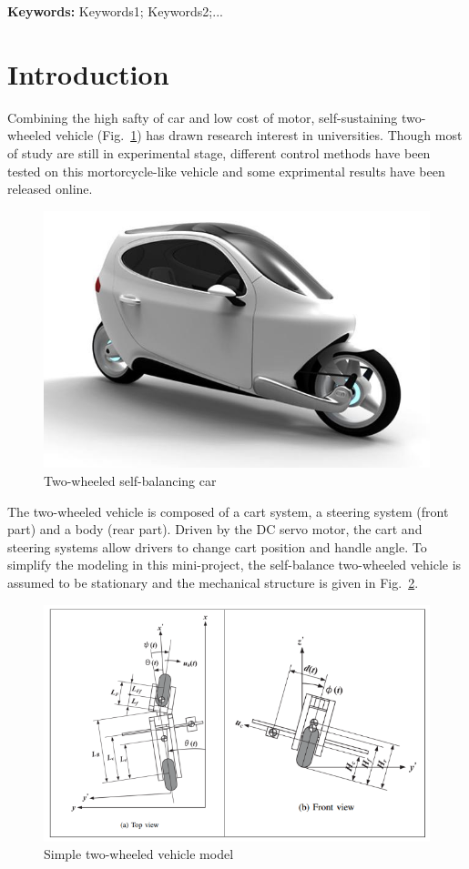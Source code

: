 \documentclass[hyperref]{article}
\theoremstyle{nonumberplain}
\begin{document}
	\vspace{1ex}
	{\noindent\small{\bf Keywords:}
		Keywords1; Keywords2;...}
	
	\newpage
	
	\tableofcontents
	\newpage
	
	\section{Introduction}
	
	Combining the high safty of car and low cost of motor, self-sustaining two-wheeled vehicle (Fig.~\ref{fig1}) has drawn research interest in universities. Though most of study are still in experimental stage, different control methods have been tested on this mortorcycle-like vehicle and some exprimental results have been released online. 
	
	\begin{figure}[htbp]
		\centering
		\includegraphics[width=0.4\linewidth]{fig1.png}
		\caption{Two-wheeled self-balancing car}
		\label{fig1}
	\end{figure} 
	
	The two-wheeled vehicle is composed of a cart system, a steering system (front part) and a body (rear part). Driven by the DC servo motor, the cart and steering systems allow drivers to change cart position and handle angle. To simplify the modeling in this mini-project, the self-balance two-wheeled vehicle is assumed to be stationary and the mechanical structure is given in Fig.~\ref{fig2}.
	
	\begin{figure}[htbp]
		\centering
		\includegraphics[width=0.6\linewidth]{fig2.png}
		\caption{Simple two-wheeled vehicle model}
		\label{fig2}
	\end{figure} 
	
\end{document}
